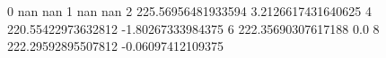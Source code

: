 0 nan nan
1 nan nan
2 225.56956481933594 3.2126617431640625
4 220.55422973632812 -1.80267333984375
6 222.35690307617188 0.0
8 222.29592895507812 -0.06097412109375
